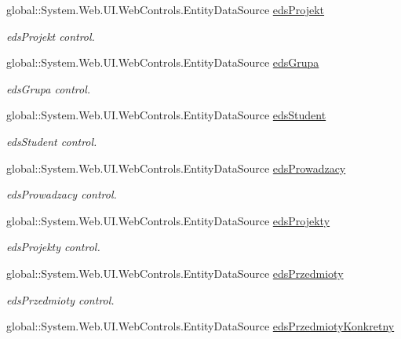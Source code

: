 \begin{DoxyCompactItemize}
global\+::\+System.\+Web.\+U\+I.\+Web\+Controls.\+Entity\+Data\+Source \hyperlink{class_dziennik_ocen_web2_1_1_web_form1_a6e12616cfa2c7a68fae19a52ae8ff00d}{eds\+Projekt}
\begin{DoxyCompactList}\small\item\em eds\+Projekt control. \end{DoxyCompactList}\item 
global\+::\+System.\+Web.\+U\+I.\+Web\+Controls.\+Entity\+Data\+Source \hyperlink{class_dziennik_ocen_web2_1_1_web_form1_aff2babfe7a3e4024805e43082cb63817}{eds\+Grupa}
\begin{DoxyCompactList}\small\item\em eds\+Grupa control. \end{DoxyCompactList}\item 
global\+::\+System.\+Web.\+U\+I.\+Web\+Controls.\+Entity\+Data\+Source \hyperlink{class_dziennik_ocen_web2_1_1_web_form1_a24e676704e911424646f8dcf6da4168a}{eds\+Student}
\begin{DoxyCompactList}\small\item\em eds\+Student control. \end{DoxyCompactList}\item 
global\+::\+System.\+Web.\+U\+I.\+Web\+Controls.\+Entity\+Data\+Source \hyperlink{class_dziennik_ocen_web2_1_1_web_form1_a7e32f1f4686ffa1bbafd6ddbd4cfade3}{eds\+Prowadzacy}
\begin{DoxyCompactList}\small\item\em eds\+Prowadzacy control. \end{DoxyCompactList}\item 
global\+::\+System.\+Web.\+U\+I.\+Web\+Controls.\+Entity\+Data\+Source \hyperlink{class_dziennik_ocen_web2_1_1_web_form1_a32e1d11a35d684b6ab04cae7227c87f9}{eds\+Projekty}
\begin{DoxyCompactList}\small\item\em eds\+Projekty control. \end{DoxyCompactList}\item 
global\+::\+System.\+Web.\+U\+I.\+Web\+Controls.\+Entity\+Data\+Source \hyperlink{class_dziennik_ocen_web2_1_1_web_form1_ada8b054b3125429b79a37e9b7fd56e0b}{eds\+Przedmioty}
\begin{DoxyCompactList}\small\item\em eds\+Przedmioty control. \end{DoxyCompactList}\item 
global\+::\+System.\+Web.\+U\+I.\+Web\+Controls.\+Entity\+Data\+Source \hyperlink{class_dziennik_ocen_web2_1_1_web_form1_a33092eb5bfd56d84a256312d7c6e1b49}{eds\+Przedmioty\+Konkretny}

\end{DoxyCompactItemize}
